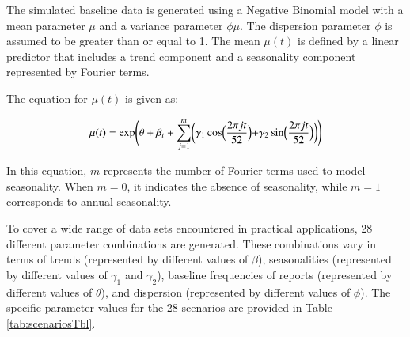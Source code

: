 \documentclass[preprint, 3p, authoryear]{elsarticle} %
\begin{document}
The simulated baseline data is generated using a Negative Binomial model with a mean parameter \(\mu\) and a variance parameter \(\phi\mu\). The dispersion parameter \(\phi\) is assumed to be greater than or equal to 1. The mean \(\mu(t)\) is defined by a linear predictor that includes a trend component and a seasonality component represented by Fourier terms.

The equation for \(\mu(t)\) is given as:

\begin{equation}
  \mu(t)=\exp\Biggl(\theta+\beta_t+\sum_{j=1}^m \biggl(\gamma_1 \cos\Bigl(\frac{2\pi jt}{52}\Bigl) + \gamma_2 \sin \Bigl(\frac{2\pi jt}{52} \Bigl)\biggl)\Biggl)
\end{equation}

In this equation, \(m\) represents the number of Fourier terms used to model seasonality. When \(m=0\), it indicates the absence of seasonality, while \(m=1\) corresponds to annual seasonality.

To cover a wide range of data sets encountered in practical applications, 28 different parameter combinations are generated. These combinations vary in terms of trends (represented by different values of \(\beta\)), seasonalities (represented by different values of \(\gamma_1\) and \(\gamma_2\)), baseline frequencies of reports (represented by different values of \(\theta\)), and dispersion (represented by different values of \(\phi\)). The specific parameter values for the 28 scenarios are provided in Table \ref{tab:scenariosTbl}.
\end{document}
